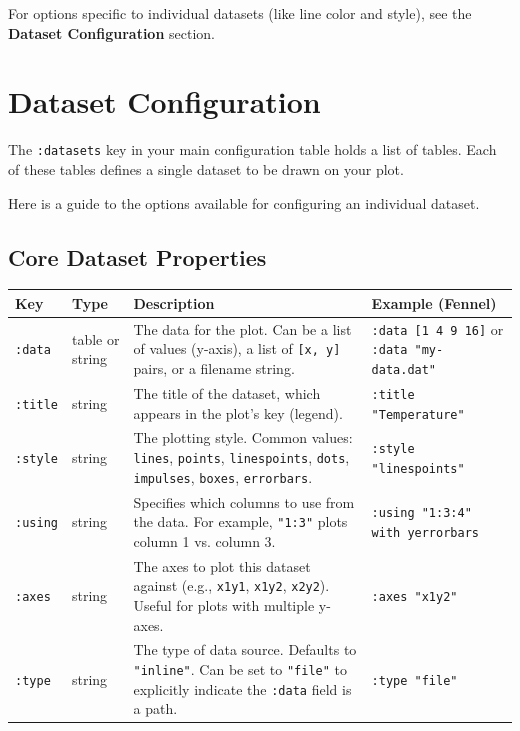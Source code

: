 \documentclass[12pt, letterpaper]{article}
\begin{document}
	For options specific to individual datasets (like line color and style), see the \textbf{Dataset Configuration} section.
	
	\newpage
	
	\section{Dataset Configuration}
	
	The \texttt{:datasets} key in your main configuration table holds a list of tables. Each of these tables defines a single dataset to be drawn on your plot.
	
	Here is a guide to the options available for configuring an individual dataset.
	
	\subsection{Core Dataset Properties}
	
	\begin{table}[htbp]
		\centering
		\begin{tabularx}{\textwidth}{l l X X}
			\toprule
			\textbf{Key} & \textbf{Type} & \textbf{Description} & \textbf{Example (Fennel)} \\
			\midrule
			\texttt{:data} & table or string & The data for the plot. Can be a list of values (y-axis), a list of \texttt{[x, y]} pairs, or a filename string. & \texttt{:data [1 4 9 16]} or \texttt{:data "my-data.dat"} \\
			\texttt{:title} & string & The title of the dataset, which appears in the plot's key (legend). & \texttt{:title "Temperature"} \\
			\texttt{:style} & string & The plotting style. Common values: \texttt{lines}, \texttt{points}, \texttt{linespoints}, \texttt{dots}, \texttt{impulses}, \texttt{boxes}, \texttt{errorbars}. & \texttt{:style "linespoints"} \\
			\texttt{:using} & string & Specifies which columns to use from the data. For example, \texttt{"1:3"} plots column 1 vs. column 3. & \texttt{:using "1:3:4" with yerrorbars} \\
			\texttt{:axes} & string & The axes to plot this dataset against (e.g., \texttt{x1y1}, \texttt{x1y2}, \texttt{x2y2}). Useful for plots with multiple y-axes. & \texttt{:axes "x1y2"} \\
			\texttt{:type} & string & The type of data source. Defaults to \texttt{"inline"}. Can be set to \texttt{"file"} to explicitly indicate the \texttt{:data} field is a path. & \texttt{:type "file"} \\
			\bottomrule
		\end{tabularx}
	\end{table}
	
\end{document}
